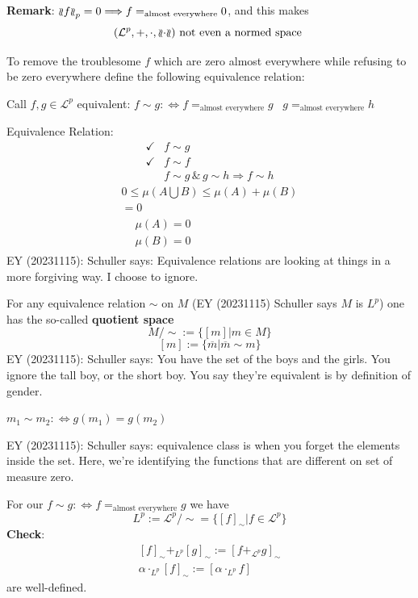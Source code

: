 \textbf{Remark}: $\mathopen{\wr\mkern-2mu\wr}f\mathclose{\wr\mkern-2mu\wr}_p = 0 \Longrightarrow f =_{\text{almost everywhere}} 0$, and this makes
\[
(\mathcal{L}^p, +, \cdot, \mathopen{\wr\mkern-2mu\wr}\cdot\mathclose{\wr\mkern-2mu\wr}) \text{ not even a normed space }
\]

To remove the troublesome $f$ which are zero almost everywhere while refusing to be zero everywhere define the following equivalence relation:

Call $f, g\in \mathcal{L}^p$ equivalent: $f \sim g : \Longleftrightarrow f =_{\text{almost everywhere}} g$ \quad \quad \, $g =_{\text{almost everywhere}} h$

Equivalence Relation:
\[
\begin{aligned}
	\checkmark & f\sim g \\
	\checkmark & f \sim f \\
	& f \sim g \, \& \, g \sim h \Longrightarrow f \sim h
\end{aligned}
\]
\[
\begin{gathered}
	0 \leq \mu (A\bigcup B) \leq \mu(A) + \mu(B) \\
	= 0 \\
	\begin{aligned}
		& \mu(A) = 0 \\
		& \mu(B) = 0
	\end{aligned}
\end{gathered}
\]
EY (20231115): Schuller says: Equivalence relations are looking at things in a more forgiving way. I choose to ignore.

For any equivalence relation $\sim$ on $M$ (EY (20231115) Schuller says $M$ is $L^p$) one has the so-called \textbf{quotient space}
\[
M / \sim := \lbrace [m] | m \in M \rbrace
\]
\[
[m] := \lbrace \overline{m} | \overline{m} \sim m \rbrace
\]
EY (20231115): Schuller says: You have the set of the boys and the girls. You ignore the tall boy, or the short boy. You say they're equivalent is by definition of gender.

$m_1 \sim m_2 : \Longleftrightarrow g(m_1) = g(m_2)$

EY (20231115): Schuller says: equivalence class is when you forget the elements inside the set. Here, we're identifying the functions that are different on set of measure zero.

For our $f\sim g : \Longleftrightarrow f =_{\text{almost everywhere}} g$ we have
\[
L^p := \mathcal{L}^p / \sim = \lbrace [f]_{\sim} | f \in \mathcal{L}^p \rbrace
\]
\textbf{Check}: 
\[
\begin{gathered}
[f]_{\sim} +_{L^p} [g]_{\sim} := [f +_{\mathcal{L}^p} g]_{\sim} \\
\alpha \cdot_{L^p} [f]_{\sim} := [\alpha \cdot_{L^p} f]
\end{gathered}
\]
are well-defined.

